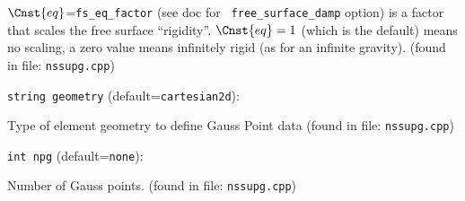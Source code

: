 $\Cnst{eq}$={\tt fs\_eq\_factor} (see doc for {\tt
free\_surface\_damp} option) is a factor that scales the free
surface ``rigidity''. $\Cnst{eq}=1$ (which is the default) means
no scaling, a zero value means infinitely rigid (as for an
infinite gravity).
 (found in file: \verb+nssupg.cpp+)
\item\verb+string geometry+ {\rm(default=\verb|cartesian2d|)}:

Type of element geometry to define Gauss Point data
 (found in file: \verb+nssupg.cpp+)
\item\verb+int npg+ {\rm(default=\verb|none|)}:

Number of Gauss points.
 (found in file: \verb+nssupg.cpp+)
